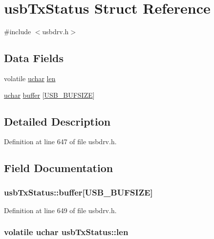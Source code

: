 \hypertarget{structusb_tx_status}{\section{usb\-Tx\-Status Struct Reference}
\label{structusb_tx_status}
}


{\ttfamily \#include $<$usbdrv.\-h$>$}

\subsection*{Data Fields}
\begin{DoxyCompactItemize}
\item 
volatile \hyperlink{usbdrv_8h_aa8ddf20cdd716b652e76e23e5e700893}{uchar} \hyperlink{structusb_tx_status_a3ee6d00644cd8bb758bffffed53022b6}{len}
\item 
\hyperlink{usbdrv_8h_aa8ddf20cdd716b652e76e23e5e700893}{uchar} \hyperlink{structusb_tx_status_ac0cd1cbb98d720cd1f6b458e5dca8b74}{buffer} \mbox{[}\hyperlink{usbdrv_8h_a1c541dbab181ea7bd3da61b892430988}{U\-S\-B\-\_\-\-B\-U\-F\-S\-I\-Z\-E}\mbox{]}
\end{DoxyCompactItemize}


\subsection{Detailed Description}


Definition at line 647 of file usbdrv.\-h.



\subsection{Field Documentation}
\hypertarget{structusb_tx_status_ac0cd1cbb98d720cd1f6b458e5dca8b74}{
\subsubsection[{buffer}]{ usb\-Tx\-Status\-::buffer\mbox{[}{\bf U\-S\-B\-\_\-\-B\-U\-F\-S\-I\-Z\-E}\mbox{]}}}\label{structusb_tx_status_ac0cd1cbb98d720cd1f6b458e5dca8b74}


Definition at line 649 of file usbdrv.\-h.

\hypertarget{structusb_tx_status_a3ee6d00644cd8bb758bffffed53022b6}{
\subsubsection[{len}]{\setlength{\rightskip}{0pt plus 5cm}volatile {\bf uchar} usb\-Tx\-Status\-::len}}\label{structusb_tx_status_a3ee6d00644cd8bb758bffffed53022b6}


